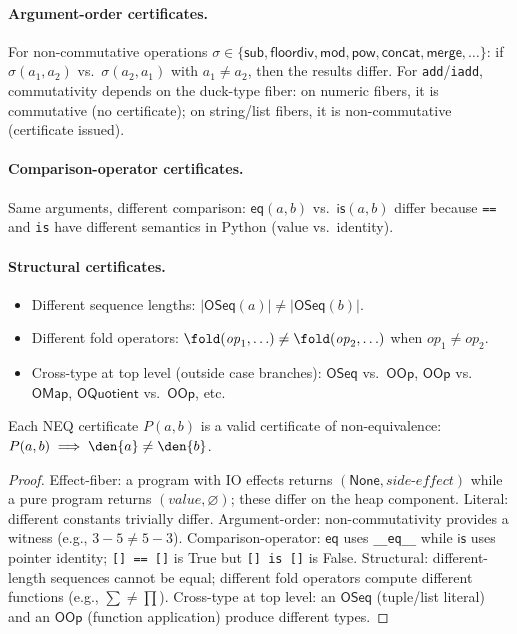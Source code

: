 \paragraph{Argument-order certificates.}
For non-commutative operations
$\sigma \in \{\mathsf{sub}, \mathsf{floordiv}, \mathsf{mod},
\mathsf{pow}, \mathsf{concat}, \mathsf{merge}, \ldots\}$:
if $\sigma(a_1, a_2)$ vs.\ $\sigma(a_2, a_1)$ with
$a_1 \neq a_2$, then the results differ.
For \texttt{add}/\texttt{iadd}, commutativity depends on the
duck-type fiber: on numeric fibers, it is commutative (no
certificate); on string/list fibers, it is non-commutative
(certificate issued).

\paragraph{Comparison-operator certificates.}
Same arguments, different comparison:
$\mathsf{eq}(a, b)$ vs.\ $\mathsf{is}(a, b)$ differ because
\texttt{==} and \texttt{is} have different semantics in Python
(value vs.\ identity).

\paragraph{Structural certificates.}
\begin{itemize}
  \item Different sequence lengths:
    $|\mathsf{OSeq}(a)| \neq |\mathsf{OSeq}(b)|$.
  \item Different fold operators:
    $\fold(\mathit{op}_1, \ldots) \neq \fold(\mathit{op}_2, \ldots)$
    when $\mathit{op}_1 \neq \mathit{op}_2$.
  \item Cross-type at top level (outside case branches):
    $\mathsf{OSeq}$ vs.\ $\mathsf{OOp}$,
    $\mathsf{OOp}$ vs.\ $\mathsf{OMap}$,
    $\mathsf{OQuotient}$ vs.\ $\mathsf{OOp}$, etc.
\end{itemize}

\begin{theorem}
\label{thm:neq-soundness}
Each NEQ certificate $P(a, b)$ is a valid certificate of
non-equivalence: $P(a, b) \implies \den{a} \neq \den{b}$.
\end{theorem}

\begin{proof}
Effect-fiber: a program with IO effects returns
$(\mathsf{None}, \mathit{side\text{-}effect})$ while a pure
program returns $(\mathit{value}, \varnothing)$; these differ
on the heap component.
Literal: different constants trivially differ.
Argument-order: non-commutativity provides a witness
(e.g., $3 - 5 \neq 5 - 3$).
Comparison-operator: $\mathsf{eq}$ uses \texttt{\_\_eq\_\_} while
$\mathsf{is}$ uses pointer identity; \texttt{[] == []} is True
but \texttt{[] is []} is False.
Structural: different-length sequences cannot be equal;
different fold operators compute different functions
(e.g., $\sum \neq \prod$).
Cross-type at top level: an $\mathsf{OSeq}$ (tuple/list literal)
and an $\mathsf{OOp}$ (function application) produce different
types.
\end{proof}

